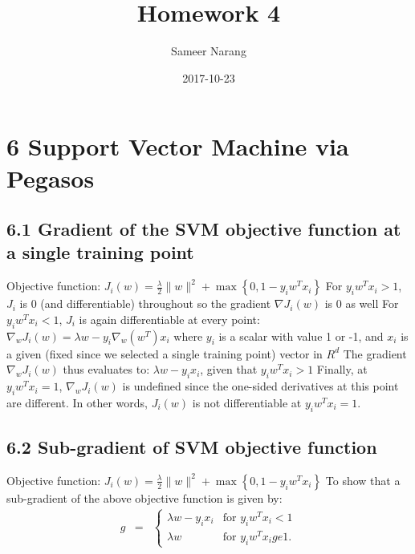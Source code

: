\documentclass{article}
\title{Homework 4}
\date{2017-10-23}
\author{Sameer Narang}
\begin{document}
\section{6 Support Vector Machine via Pegasos}
    \subsection{6.1 Gradient of the SVM objective function at a single training point}
    Objective function:
    $J_{i}(w)=\frac{\lambda}{2}\|w\|^{2}+\max\left\{ 0,1-y_{i}w^{T}x_{i}\right\}$
    \newline
    \newline
    For $y_{i}w^{T}x_{i} > 1$, $J_{i}$ is 0 (and differentiable) throughout so the gradient $\nabla J_{i}(w)$ is 0 as well
    \newline
    \newline
    For  $y_{i}w^{T}x_{i} < 1$, $J_{i}$ is again differentiable at every point:
    \newline
    $\nabla _{w} J_{i}(w) = \lambda w - y_{i} \nabla _{w} (w^{T})x_{i}$
    \newline
    \newline
    where $y_{i}$ is a scalar with value 1 or -1, and $x_{i}$ is a given (fixed since we selected a single training point) vector in $R^{d}$
    \newline
    \newline
    The gradient $\nabla _{w} J_{i}(w)$ thus evaluates to:
    $\lambda w - y_{i}x_{i}$, given that $y_{i}w^{T}x_{i} > 1$
    \newline
    \newline
    Finally, at $y_{i}w^{T}x_{i} = 1$, $\nabla _{w} J_{i}(w)$ is undefined since the one-sided derivatives at this point are different. In other words, $J_{i}(w)$ is not differentiable at $y_{i}w^{T}x_{i} = 1$.

    \subsection{6.2 Sub-gradient of SVM objective function}
    Objective function:
    $J_{i}(w)=\frac{\lambda}{2}\|w\|^{2}+\max\left\{ 0,1-y_{i}w^{T}x_{i}\right\}$
    \newline
    \newline
    To show that a sub-gradient of the above objective function is given by:
    \newline
    \begin{eqnarray*}
    g & = & \begin{cases}
    \lambda w-y_{i}x_{i} & \mbox{for }y_{i}w^{T}x_{i}<1\\
    \lambda w & \mbox{for }y_{i}w^{T}x_{i}ge1.
    \end{cases}
    \end{eqnarray*}
\end{document}
